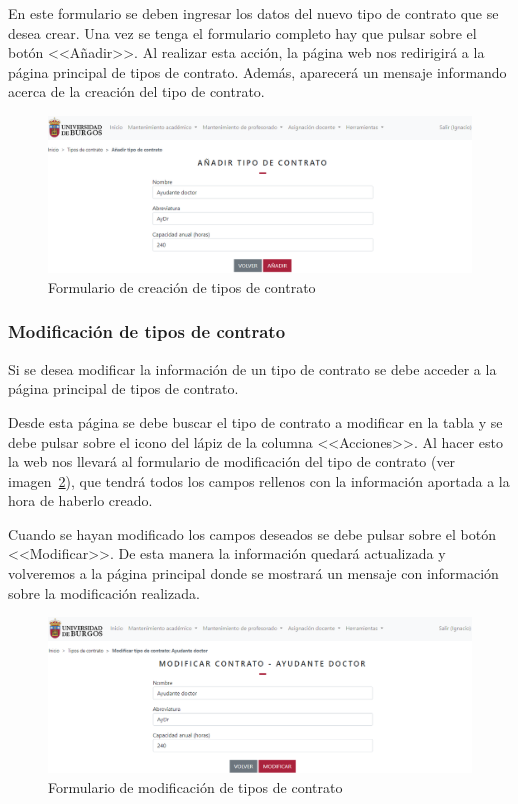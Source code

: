 En este formulario se deben ingresar los datos del nuevo tipo de contrato que se desea crear.
Una vez se tenga el formulario completo hay que pulsar sobre el botón <<Añadir>>.
Al realizar esta acción, la página web nos redirigirá a la página principal de tipos de contrato.
Además, aparecerá un mensaje informando acerca de la creación del tipo de contrato.

\begin{figure}
	\centering
	\includegraphics[width=\textwidth]{../img/Anexos/Manual usuario/formContrato.png}
	\caption{Formulario de creación de tipos de contrato}\label{pag:formContrato}
\end{figure}

\subsubsection{Modificación de tipos de contrato}
Si se desea modificar la información de un tipo de contrato se debe acceder a la página principal de tipos de contrato.

Desde esta página se debe buscar el tipo de contrato a modificar en la tabla y se debe pulsar sobre el icono del lápiz de la columna <<Acciones>>.
Al hacer esto la web nos llevará al formulario de modificación del tipo de contrato (ver imagen~\ref{pag:formModContrato}), que tendrá todos los campos rellenos con la información aportada a la hora de haberlo creado.

Cuando se hayan modificado los campos deseados se debe pulsar sobre el botón <<Modificar>>.
De esta manera la información quedará actualizada y volveremos a la página principal donde se mostrará un mensaje con información sobre la modificación realizada.

\begin{figure}
	\centering
	\includegraphics[width=\textwidth]{../img/Anexos/Manual usuario/formModContrato.png}
	\caption{Formulario de modificación de tipos de contrato}\label{pag:formModContrato}
\end{figure}

